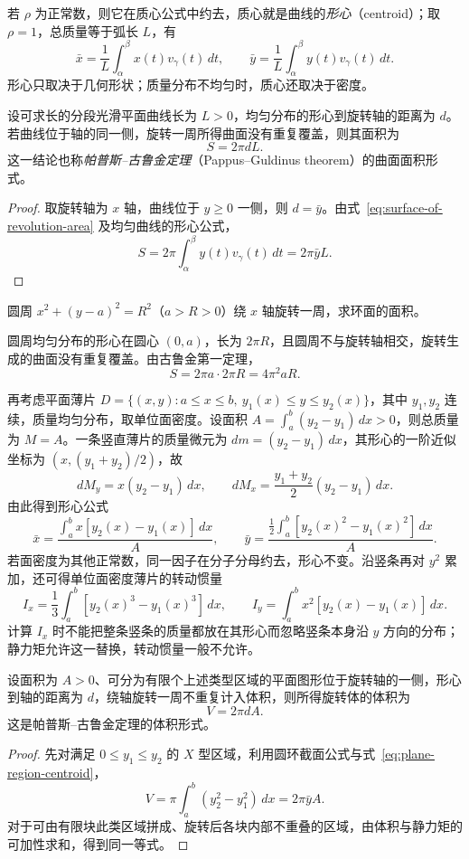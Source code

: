 \documentclass[UTF8,12pt,a4paper,fontset=fandol]{ctexbook}
\begin{document}
若 $\rho$ 为正常数，则它在质心公式中约去，质心就是曲线的\emph{形心}（centroid）；取 $\rho=1$，总质量等于弧长 $L$，有
\[
    \bar x=\frac1L\int_\alpha^\beta x(t)v_\gamma(t)\,dt,\qquad
    \bar y=\frac1L\int_\alpha^\beta y(t)v_\gamma(t)\,dt.
\]
形心只取决于几何形状；质量分布不均匀时，质心还取决于密度。

\begin{theorem}[古鲁金第一定理]
\label{thm:guldin-surface-area}
设可求长的分段光滑平面曲线长为 $L>0$，均匀分布的形心到旋转轴的距离为 $d$。若曲线位于轴的同一侧，旋转一周所得曲面没有重复覆盖，则其面积为
\[
    S=2\pi dL.
\]
这一结论也称\emph{帕普斯--古鲁金定理}（Pappus--Guldinus theorem）的曲面面积形式。
\end{theorem}
\begin{proof}
取旋转轴为 $x$ 轴，曲线位于 $y\geq0$ 一侧，则 $d=\bar y$。由式~\eqref{eq:surface-of-revolution-area} 及均匀曲线的形心公式，
\[
    S=2\pi\int_\alpha^\beta y(t)v_\gamma(t)\,dt=2\pi\bar yL.
\]
\end{proof}

\begin{example}
\label{ex:torus-surface-area-guldin}
圆周 $x^2+(y-a)^2=R^2$（$a>R>0$）绕 $x$ 轴旋转一周，求环面的面积。
\end{example}
\begin{solve}
圆周均匀分布的形心在圆心 $(0,a)$，长为 $2\pi R$，且圆周不与旋转轴相交，旋转生成的曲面没有重复覆盖。由古鲁金第一定理，
\[
    S=2\pi a\cdot2\pi R=4\pi^2aR.
\]
\end{solve}

再考虑平面薄片 $D=\{(x,y):a\leq x\leq b,\ y_1(x)\leq y\leq y_2(x)\}$，其中 $y_1,y_2$ 连续，质量均匀分布，取单位面密度。设面积 $A=\int_a^b(y_2-y_1)\,dx>0$，则总质量为 $M=A$。一条竖直薄片的质量微元为 $dm=(y_2-y_1)\,dx$，其形心的一阶近似坐标为 $(x,(y_1+y_2)/2)$，故
\[
    dM_y=x(y_2-y_1)\,dx,\qquad
    dM_x=\frac{y_1+y_2}{2}(y_2-y_1)\,dx.
\]
由此得到形心公式
\begin{equation}
    \bar x=\frac{\int_a^bx[y_2(x)-y_1(x)]\,dx}{A},\qquad
    \bar y=\frac{\frac12\int_a^b[y_2(x)^2-y_1(x)^2]\,dx}{A}.
    \label{eq:plane-region-centroid}
\end{equation}
若面密度为其他正常数，同一因子在分子分母约去，形心不变。沿竖条再对 $y^2$ 累加，还可得单位面密度薄片的转动惯量
\[
    I_x=\frac13\int_a^b[y_2(x)^3-y_1(x)^3]\,dx,\qquad
    I_y=\int_a^bx^2[y_2(x)-y_1(x)]\,dx.
\]
计算 $I_x$ 时不能把整条竖条的质量都放在其形心而忽略竖条本身沿 $y$ 方向的分布；静力矩允许这一替换，转动惯量一般不允许。

\begin{theorem}[古鲁金第二定理]
\label{thm:guldin-volume}
设面积为 $A>0$、可分为有限个上述类型区域的平面图形位于旋转轴的一侧，形心到轴的距离为 $d$，绕轴旋转一周不重复计入体积，则所得旋转体的体积为
\[
    V=2\pi dA.
\]
这是帕普斯--古鲁金定理的体积形式。
\end{theorem}
\begin{proof}
先对满足 $0\leq y_1\leq y_2$ 的 $X$ 型区域，利用圆环截面公式与式~\eqref{eq:plane-region-centroid}，
\[
    V=\pi\int_a^b(y_2^2-y_1^2)\,dx=2\pi\bar yA.
\]
对于可由有限块此类区域拼成、旋转后各块内部不重叠的区域，由体积与静力矩的可加性求和，得到同一等式。
\end{proof}
\end{document}
